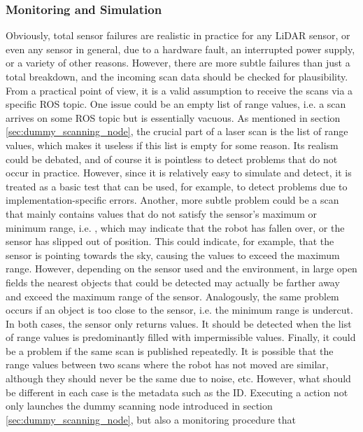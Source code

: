 \documentclass[english, master, utf8]{base/thesis_KBS}
\newcommand{\code}{\collectverb{\codebox}}
\begin{document}
\subsubsection{Monitoring and Simulation}

Obviously, total sensor failures are realistic in practice for any LiDAR sensor, or even any sensor in general, due to a hardware fault, an interrupted
power supply, or a variety of other reasons. However, there are more subtle failures than just a total breakdown, and the incoming scan data should be checked for plausibility.
From a practical point of view, it is a valid assumption to receive the scans via a specific ROS topic. One issue could be an empty list of range values, i.e. a scan arrives on
some ROS topic but is essentially vacuous. As mentioned in section \ref{sec:dummy_scanning_node}, the crucial part of a laser scan is the list of range values, which makes it 
useless if this list is empty for some reason. Its realism could be debated, and of course it is pointless to detect problems that do not occur in practice. However, since it is
relatively easy to simulate and detect, it is treated as a basic test that can be used, for example, to detect problems due to implementation-specific errors.
Another, more subtle problem could be a scan that mainly contains values that do not satisfy the sensor's maximum or minimum range, i.e. \code{inf}, which may indicate that
the robot has fallen over, or the sensor has slipped out of position. This could indicate, for example, that the sensor is pointing towards the sky, causing the values to exceed
the maximum range. However, depending on the sensor used and the environment, in large open fields the nearest objects that could be detected may actually be farther away and exceed
the maximum range of the sensor. Analogously, the same problem occurs if an object is too close to the sensor, i.e. the minimum range is undercut. In both cases, the sensor only
returns \code{inf} values. It should be detected when the list of range values is predominantly filled with impermissible \code{inf} values. Finally, it could be a problem if the
same scan is published repeatedly. It is possible that the range values between two scans where the robot has not moved are similar, although they should never be the same due to
noise, etc. However, what should be different in each case is the metadata such as the ID.\newline
Executing a \code{scan} action not only launches the dummy scanning node introduced in section \ref{sec:dummy_scanning_node}, but also a monitoring procedure that
\end{document}

